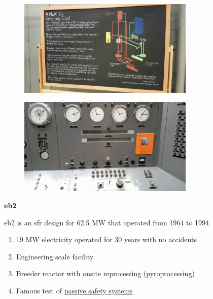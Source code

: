 \documentclass[aspectratio=1610,pdftex,dvipsnames,compress,xcolor={dvipsnames}]{beamer}
\newcommand{\acf}{\acrfull} %
\newcommand{\acs}{\acrshort} %
\begin{document}
\begin{frame}{}
    \begin{figure}
        \centering
        \includegraphics[width=0.75\textwidth]{ebr13.jpg}
    \end{figure}
\end{frame}


\begin{frame}{}
    \begin{figure}
        \centering
        \includegraphics[width=0.75\textwidth]{ebr14.jpg}
    \end{figure}
\end{frame}


\begin{frame}[plain]{}
    \centering\LARGE\textbf{\acs{eb2}}
\end{frame}


\addtocounter{framenumber}{-1} 
\begin{frame}{\acs{eb2} is an \acf{sfr} design for 62.5 MW that operated from 1964 to 1994}
    \begin{enumerate}[series=outerlist,topsep=0pt,itemsep=21pt,leftmargin=*,label=(\arabic*)]
        \item[]19 MW electricity operated for 30 years with no accidents
        \item[]Engineering scale facility
        \item[]Breeder reactor with onsite reprocessing (pyroprocessing)
        \item[]Famous test of \href{https://youtu.be/Sp1Xja6HlIU}{passive safety systems}
    \end{enumerate}
\end{frame}
\end{document}

